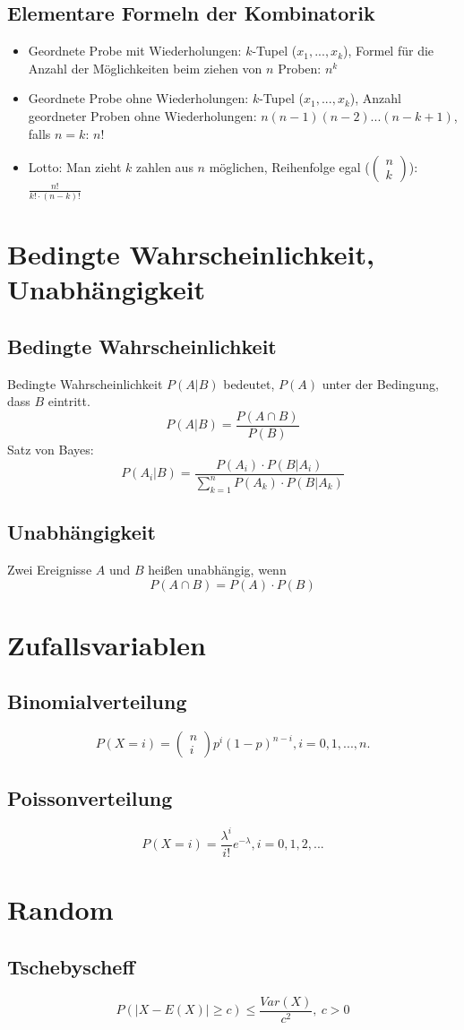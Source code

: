 \documentclass[12pt,a4paper]{article}
\begin{document}
\subsection{Elementare Formeln der Kombinatorik}
\begin{itemize}
\item
Geordnete Probe mit Wiederholungen: $k$-Tupel ($x_1,...,x_k$), Formel für die Anzahl der Möglichkeiten beim ziehen von $n$ Proben: $n^k$
\item
Geordnete Probe ohne Wiederholungen: $k$-Tupel ($x_1,...,x_k$), Anzahl geordneter Proben ohne Wiederholungen: $n(n-1)(n-2)...(n-k+1)$, falls $n=k$: $n!$
\item
Lotto: Man zieht $k$ zahlen aus $n$ möglichen, Reihenfolge egal ($\begin{pmatrix} n \\ k \end{pmatrix}$): $\frac{n!}{k!\cdot (n-k)!}$
\end{itemize}

\section{Bedingte Wahrscheinlichkeit, Unabhängigkeit}
\subsection{Bedingte Wahrscheinlichkeit}
Bedingte Wahrscheinlichkeit $P(A | B)$ bedeutet, $P(A)$ unter der Bedingung, dass $B$ eintritt.
\[P(A|B) = \frac{P(A \cap B)}{P(B)}\]
Satz von Bayes:
\[P(A_i|B)=\frac{P(A_i) \cdot P(B|A_i)}{\sum^n_{k=1}{P(A_k) \cdot P(B|A_k)}}\]

\subsection{Unabhängigkeit}
Zwei Ereignisse $A$ und $B$ heißen unabhängig, wenn
\[P(A \cap B) = P(A) \cdot P(B)\]

\section{Zufallsvariablen}

\subsection{Binomialverteilung}
\[P(X=i) = \left(\begin{array}{c} n \\ i \end{array}\right) p^i(1-p)^{n-i}, i = 0,1,...,n.\]

\subsection{Poissonverteilung}
\[P(X = i) = \frac{\lambda^i}{i!} e^{-\lambda}, i=0,1,2,...\]

\section{Random}
\subsection{Tschebyscheff}
\[ P(\left| X - E(X)\right| \geq c) \leq \frac{Var(X)}{c^2}, \ c > 0\]
\end{document}
